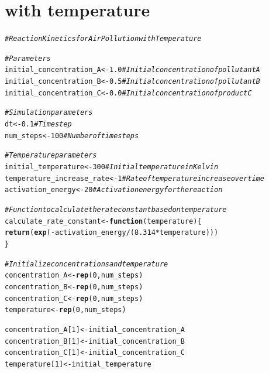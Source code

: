 \documentclass{tufte-handout}\usepackage[]{graphicx}\usepackage[]{xcolor}
\makeatletter
\newcommand{\hlnum}[1]{\textcolor[rgb]{0.686,0.059,0.569}{#1}}%
\newcommand{\hlcom}[1]{\textcolor[rgb]{0.678,0.584,0.686}{\textit{#1}}}%
\newcommand{\hlopt}[1]{\textcolor[rgb]{0,0,0}{#1}}%
\newcommand{\hlstd}[1]{\textcolor[rgb]{0.345,0.345,0.345}{#1}}%
\newcommand{\hlkwa}[1]{\textcolor[rgb]{0.161,0.373,0.58}{\textbf{#1}}}%
\newcommand{\hlkwb}[1]{\textcolor[rgb]{0.69,0.353,0.396}{#1}}%
\newcommand{\hlkwc}[1]{\textcolor[rgb]{0.333,0.667,0.333}{#1}}%
\newcommand{\hlkwd}[1]{\textcolor[rgb]{0.737,0.353,0.396}{\textbf{#1}}}%
\newenvironment{kframe}{%
 \def\at@end@of@kframe{}%
 \ifinner\ifhmode%
  \def\at@end@of@kframe{\end{minipage}}%
  \begin{minipage}{\columnwidth}%
 \fi\fi%
 \def\FrameCommand##1{\hskip\@totalleftmargin \hskip-\fboxsep
 \colorbox{shadecolor}{##1}\hskip-\fboxsep
     \hskip-\linewidth \hskip-\@totalleftmargin \hskip\columnwidth}%
 \MakeFramed {\advance\hsize-\width
   \@totalleftmargin\z@ \linewidth\hsize
   \@setminipage}}%
 {\par\unskip\endMakeFramed%
 \at@end@of@kframe}
\newenvironment{knitrout}{}{} %
\makeatother
\begin{document}
\section{with temperature}
\begin{knitrout}
\color{fgcolor}\begin{kframe}
\begin{alltt}
\hlcom{# Reaction Kinetics for Air Pollution with Temperature}

\hlcom{# Parameters}
\hlstd{initial_concentration_A} \hlkwb{<-} \hlnum{1.0}  \hlcom{# Initial concentration of pollutant A}
\hlstd{initial_concentration_B} \hlkwb{<-} \hlnum{0.5}  \hlcom{# Initial concentration of pollutant B}
\hlstd{initial_concentration_C} \hlkwb{<-} \hlnum{0.0}  \hlcom{# Initial concentration of product C}

\hlcom{# Simulation parameters}
\hlstd{dt} \hlkwb{<-} \hlnum{0.1}    \hlcom{# Time step}
\hlstd{num_steps} \hlkwb{<-} \hlnum{100}   \hlcom{# Number of time steps}

\hlcom{# Temperature parameters}
\hlstd{initial_temperature} \hlkwb{<-} \hlnum{300}  \hlcom{# Initial temperature in Kelvin}
\hlstd{temperature_increase_rate} \hlkwb{<-} \hlnum{1}  \hlcom{# Rate of temperature increase over time}
\hlstd{activation_energy} \hlkwb{<-} \hlnum{20}  \hlcom{# Activation energy for the reaction}

\hlcom{# Function to calculate the rate constant based on temperature}
\hlstd{calculate_rate_constant} \hlkwb{<-} \hlkwa{function}\hlstd{(}\hlkwc{temperature}\hlstd{) \{}
  \hlkwd{return}\hlstd{(}\hlkwd{exp}\hlstd{(}\hlopt{-}\hlstd{activation_energy} \hlopt{/} \hlstd{(}\hlnum{8.314} \hlopt{*} \hlstd{temperature)))}
\hlstd{\}}

\hlcom{# Initialize concentrations and temperature}
\hlstd{concentration_A} \hlkwb{<-} \hlkwd{rep}\hlstd{(}\hlnum{0}\hlstd{, num_steps)}
\hlstd{concentration_B} \hlkwb{<-} \hlkwd{rep}\hlstd{(}\hlnum{0}\hlstd{, num_steps)}
\hlstd{concentration_C} \hlkwb{<-} \hlkwd{rep}\hlstd{(}\hlnum{0}\hlstd{, num_steps)}
\hlstd{temperature} \hlkwb{<-} \hlkwd{rep}\hlstd{(}\hlnum{0}\hlstd{, num_steps)}

\hlstd{concentration_A[}\hlnum{1}\hlstd{]} \hlkwb{<-} \hlstd{initial_concentration_A}
\hlstd{concentration_B[}\hlnum{1}\hlstd{]} \hlkwb{<-} \hlstd{initial_concentration_B}
\hlstd{concentration_C[}\hlnum{1}\hlstd{]} \hlkwb{<-} \hlstd{initial_concentration_C}
\hlstd{temperature[}\hlnum{1}\hlstd{]} \hlkwb{<-} \hlstd{initial_temperature}


\end{alltt}
\end{kframe}
\end{knitrout}
\end{document}
